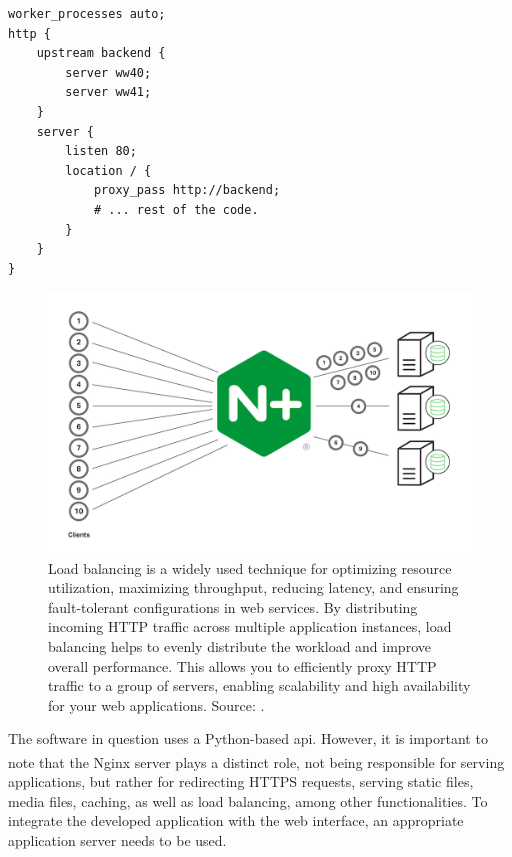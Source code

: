\begin{lstlisting}[style=nginx, label={code:nginx}, xleftmargin=2.75em, language=nginx, caption={This configuration enables load balancing for the 'backend' service using Nginx. This allows to distribute incoming network traffic across multiple servers to improve performance, scalability, and reliability. The service is distributed in two other identical services running in parallel, ww40 and ww41.}, captionpos=b]
worker_processes auto;
http {
    upstream backend {
        server ww40;
        server ww41;
    }
    server {
        listen 80;
        location / {
            proxy_pass http://backend;
            # ... rest of the code.
        }
    }
}
\end{lstlisting}

\begin{figure}[ht!]
    \centering
    \includegraphics[width=.65\linewidth]{images/Development/chap4/load_balancing.png} 
    \caption{Load balancing is a widely used technique for optimizing resource utilization, maximizing throughput, reducing latency, and ensuring fault-tolerant configurations in web services. By distributing incoming HTTP traffic across multiple application instances, load balancing helps to evenly distribute the workload and improve overall performance. This allows you to efficiently proxy HTTP traffic to a group of servers, enabling scalability and high availability for your web applications. Source: \cite{nginx}.}
    \label{fig:loadBalancing}
\end{figure}

The software in question uses a Python-based \gls{api}. However, it is important to note that the Nginx\textsuperscript{\textregistered} server plays a distinct role, not being responsible for serving applications, but rather for redirecting HTTPS requests, serving static files, media files, caching, as well as load balancing, among other functionalities. To integrate the developed application with the web interface, an appropriate application server needs to be used.

